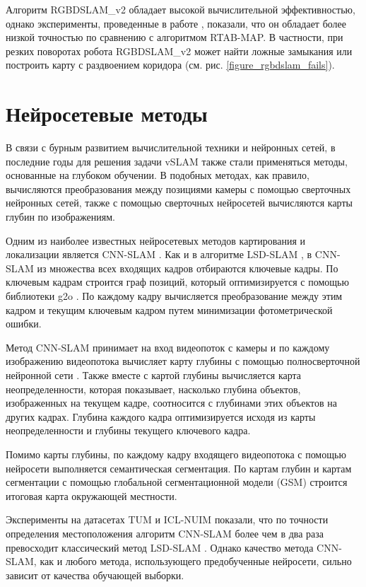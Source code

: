 \documentclass{mipt-thesis-ms}
\begin{document}
	Алгоритм RGBDSLAM\_v2 обладает высокой вычислительной эффективностью, однако эксперименты, проведенные в работе \cite{bokovoy2020map}, показали, что он обладает более низкой точностью по сравнению с алгоритмом RTAB-MAP. В частности, при резких поворотах робота RGBDSLAM\_v2 может найти ложные замыкания или построить карту с раздвоением коридора (см. рис. \ref{figure_rgbdslam_fails}).
	
	\section{Нейросетевые методы}
	
	В связи с бурным развитием вычислительной техники и нейронных сетей, в последние годы для решения задачи vSLAM также стали применяться методы, основанные на глубоком обучении. В подобных методах, как правило, вычисляются преобразования между позициями камеры с помощью сверточных нейронных сетей, также с помощью сверточных нейросетей вычисляются карты глубин по изображениям.
	
	Одним из наиболее известных нейросетевых методов картирования и локализации является CNN-SLAM \cite{tateno2017cnn}.	Как и в алгоритме LSD-SLAM \cite{engel2014lsd}, в CNN-SLAM из множества всех входящих кадров отбираются ключевые кадры. По ключевым кадрам строится граф позиций, который оптимизируется с помощью библиотеки g2o \cite{grisetti2011g2o}. По каждому кадру вычисляется преобразование между этим кадром и текущим ключевым кадром путем минимизации фотометрической ошибки.
	
	Метод CNN-SLAM принимает на вход видеопоток с камеры и по каждому изображению видеопотока вычисляет карту глубины с помощью полносверточной нейронной сети \cite{laina2016deeper}. Также вместе с картой глубины вычисляется карта неопределенности, которая показывает, насколько глубина объектов, изображенных на текущем кадре, соотносится с глубинами этих объектов на других кадрах. Глубина каждого кадра оптимизируется исходя из карты неопределенности и глубины текущего ключевого кадра.
	 
	Помимо карты глубины, по каждому кадру входящего видеопотока с помощью нейросети выполняется семантическая сегментация. По картам глубин и картам сегментации с помощью глобальной сегментационной модели (GSM) \cite{tateno2015real} строится итоговая карта окружающей местности.
	
	Эксперименты на датасетах TUM \cite{sturm2012benchmark} и ICL-NUIM \cite{handa2014benchmark} показали, что по точности определения местоположения алгоритм CNN-SLAM более чем в два раза превосходит классический метод LSD-SLAM \cite{engel2014lsd}. Однако качество метода CNN-SLAM, как и любого метода, использующего предобученные нейросети, сильно зависит от качества обучающей выборки.
	
\end{document}
